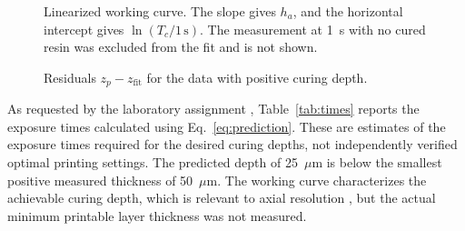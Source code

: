 \documentclass[10pt]{article}
\begin{document}
\begin{figure}[h]
\centering
{}
\caption{Linearized working curve. The slope gives $h_a$, and the horizontal intercept gives $\ln(T_c/1\,\mathrm{s})$. The measurement at 1~s with no cured resin was excluded from the fit and is not shown.}
\label{fig:linearcuring}
\end{figure}

\begin{figure}[h]
\centering
{}
\caption{Residuals $z_p-z_{\mathrm{fit}}$ for the data with positive curing depth.}
\label{fig:residuals}
\end{figure}

As requested by the laboratory assignment \cite{vilnius2020mnft3}, Table~\ref{tab:times} reports the exposure times calculated using Eq.~\eqref{eq:prediction}. These are estimates of the exposure times required for the desired curing depths, not independently verified optimal printing settings. The predicted depth of 25~$\mu$m is below the smallest positive measured thickness of 50~$\mu$m. The working curve characterizes the achievable curing depth, which is relevant to axial resolution \cite{vilnius2020mnft3}, but the actual minimum printable layer thickness was not measured.
\end{document}
